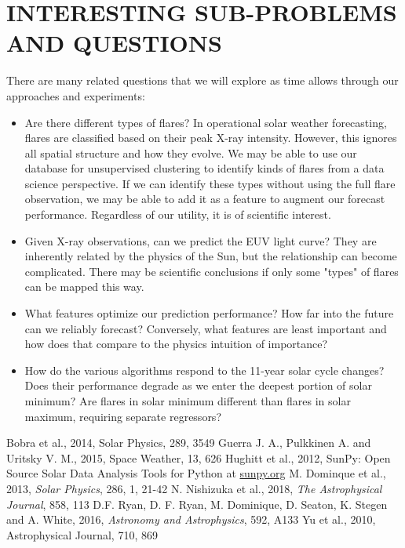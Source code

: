 \documentclass[letterpaper, 10 pt, onecolumn]{ieeeconf}
\begin{document}
\section{INTERESTING SUB-PROBLEMS AND QUESTIONS}
There are many related questions that we will explore as time allows through our approaches and experiments:
\begin{itemize}
\item Are there different types of flares? In operational solar weather forecasting, flares are classified based on their peak X-ray intensity. However, this ignores all spatial structure and how they evolve. We may be able to use our database for unsupervised clustering to identify kinds of flares from a data science perspective. If we can identify these types without using the full flare observation, we may be able to add it as a feature to augment our forecast performance. Regardless of our utility, it is of scientific interest. 
\item Given X-ray observations, can we predict the EUV light curve? They are inherently related by the physics of the Sun, but the relationship can become complicated. There may be scientific conclusions if only some "types" of flares can be mapped this way. 
\item What features optimize our prediction performance? How far into the future can we reliably forecast? Conversely, what features are least important and how does that compare to the physics intuition of importance?
\item How do the various algorithms respond to the 11-year solar cycle changes? Does their performance degrade as we enter the deepest portion of solar minimum? Are flares in solar minimum different than flares in solar maximum, requiring separate regressors? 
\end{itemize}

\begin{thebibliography}{99}
 Bobra et al., 2014, Solar Physics, 289, 3549
 Guerra J. A., Pulkkinen A. and Uritsky V. M., 2015, Space Weather, 13, 626
 Hughitt et al., 2012, SunPy: Open Source Solar Data Analysis Tools for Python at \url{sunpy.org}
 M. Dominque et al., 2013, \textit{Solar Physics}, 286, 1, 21-42 
 N. Nishizuka et al., 2018, \textit{The Astrophysical Journal}, 858, 113
 D.F. Ryan, D. F. Ryan,  M. Dominique, D. Seaton, K. Stegen and A. White, 2016, \textit{Astronomy and Astrophysics}, 592, A133
 Yu et al., 2010, Astrophysical Journal, 710, 869

\end{thebibliography}
\end{document}
